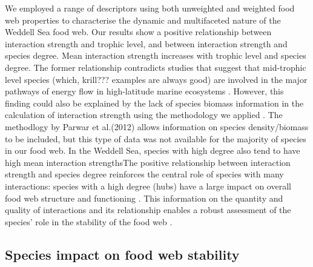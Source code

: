 \documentclass[gc, manuscript]{copernicus}
\begin{document}
We employed a range of descriptors using both unweighted and weighted
food web properties to characterise the dynamic and multifaceted nature
of the Weddell Sea food web. Our results show a positive relationship
between interaction strength and trophic level, and between interaction
strength and species degree. Mean interaction strength increases with
trophic level and species degree. The former relationship contradicts
studies that suggest that mid-trophic level species (which, krill???
examples are always good) are involved in the major pathways of energy
flow in high-latitude marine ecosystems
\citep{Pinkerton2014, Murphy2016, McCormack2020, Riccialdelli2020}.
However, this finding could also be explained by the lack of species
biomass information in the calculation of interaction strength using the
methodology we applied \citep{Parwar2012}. The methodlogy by Parwar et
al.(2012) allows information on species density/biomass to be included,
but this type of data was not available for the majority of species in
our food web. In the Weddell Sea, species with high degree also tend to
have high mean interaction strengthsThe positive relationship between
interaction strength and species degree reinforces the central role of
species with many interactions: species with a high degree (hubs) have a
large impact on overall food web structure and functioning
\citep{Dunne2002a, Kortsch2015}. This information on the quantity and
quality of interactions and its relationship enables a robust assessment
of the species' role in the stability of the food web
\citep{Cirtwill2018a}.

\subsection{Species impact on food web stability}
\end{document}
